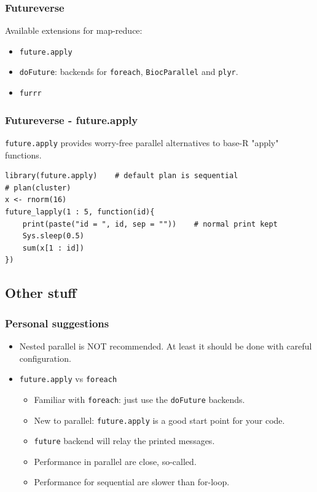 \documentclass[aspectratio=169,xcolor={dvipsnames,table}]{beamer}
\begin{document}
\begin{frame}[fragile]
  \frametitle{Futureverse}
  \par
  Available extensions for map-reduce:
    \begin{itemize}
    \item \texttt{future.apply}
    \item \texttt{doFuture}: backends for \texttt{foreach}, \texttt{BiocParallel} and \texttt{plyr}.
    \item \texttt{furrr}
    \end{itemize}
\end{frame}

\begin{frame}[fragile]
  \frametitle{Futureverse - future.apply}
\texttt{future.apply} provides worry-free parallel alternatives to base-R "apply" functions.
\begin{verbatim}
library(future.apply)    # default plan is sequential
# plan(cluster)
x <- rnorm(16)
future_lapply(1 : 5, function(id){
    print(paste("id = ", id, sep = ""))    # normal print kept
    Sys.sleep(0.5)
    sum(x[1 : id])
})
\end{verbatim}
\end{frame}

\subsection{Other stuff}
\begin{frame}
  \frametitle{Personal suggestions}
  \begin{itemize}
  \item Nested parallel is {\color{Brown}NOT} recommended. At least it should be done with careful configuration.
  \item \texttt{future.apply} vs \texttt{foreach}
    \begin{itemize}
    \item Familiar with \texttt{foreach}: just use the \texttt{doFuture} backends.
    \item New to parallel: \texttt{future.apply} is a good start point for your code.
    \item \texttt{future} backend will relay the printed messages.
    \item Performance in parallel are close, {\color{Brown} so-called}.
    \item Performance for sequential are slower than for-loop.
    \end{itemize}
  \end{itemize}
\end{frame}
\end{document}
